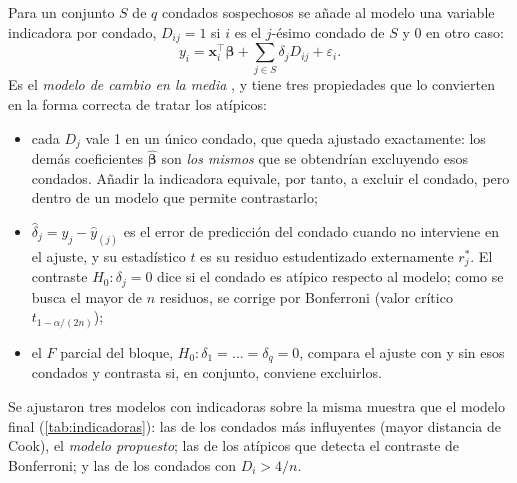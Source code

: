 Para un conjunto $S$ de $q$ condados sospechosos se añade al modelo una variable indicadora por
condado, $D_{ij}=1$ si $i$ es el $j$-ésimo condado de $S$ y $0$ en otro caso:
\[
y_i=\mathbf{x}_i^{\top}\boldsymbol\beta+\sum_{j\in S}\delta_j D_{ij}+\varepsilon_i .
\]
Es el \emph{modelo de cambio en la media} \parencite{cook1982}, y tiene tres propiedades que lo
convierten en la forma correcta de tratar los atípicos:
\begin{itemize}
  \item cada $D_j$ vale 1 en un único condado, que queda ajustado exactamente: los demás
  coeficientes $\hat{\boldsymbol\beta}$ son \emph{los mismos} que se obtendrían excluyendo esos
  condados. Añadir la indicadora equivale, por tanto, a excluir el condado, pero dentro de un
  modelo que permite contrastarlo;
  \item $\hat\delta_j=y_j-\hat y_{(j)}$ es el error de predicción del condado cuando no interviene
  en el ajuste, y su estadístico $t$ es su residuo estudentizado externamente $r_j^{*}$. El
  contraste $H_0\colon\delta_j=0$ dice si el condado es atípico respecto al modelo; como se busca el
  mayor de $n$ residuos, se corrige por Bonferroni (valor crítico $t_{1-\alpha/(2n)}$);
  \item el $F$ parcial del bloque, $H_0\colon\delta_1=\dots=\delta_q=0$, compara el ajuste con y
  sin esos condados y contrasta si, en conjunto, conviene excluirlos.
\end{itemize}

Se ajustaron tres modelos con indicadoras sobre la misma muestra que el modelo final
(\cref{tab:indicadoras}): las de los  condados más influyentes (mayor distancia de
Cook), el \emph{modelo propuesto}; las de los  atípicos que detecta el contraste de
Bonferroni; y las de los  condados con $D_i>4/n$.



